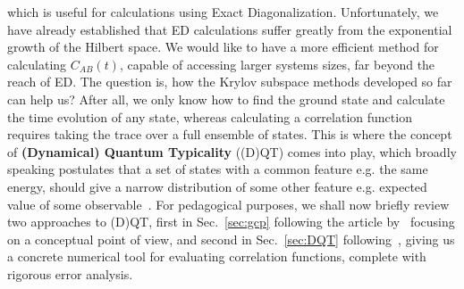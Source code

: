 which is useful for calculations using Exact Diagonalization. Unfortunately, we have already established that ED calculations
suffer greatly from the exponential growth of the Hilbert space.
We would like to have a more efficient method for calculating \(C_{AB}(t)\), capable of accessing larger systems
sizes, far beyond the reach of ED. The question is, how the Krylov subspace methods developed so far can help us?
After all, we only know how to find the ground state and calculate the time evolution of any state, whereas
calculating a correlation function requires taking the trace over a full ensemble of states. This is where the concept
of \textbf{(Dynamical) Quantum Typicality} ((D)QT) comes into play, which broadly speaking postulates that
a set of states with a common feature e.g. the same energy, should give a narrow distribution of some
other feature e.g. expected value of some observable~\autocite{Bartsch2009}. For pedagogical purposes, we shall
now briefly review two approaches to (D)QT, first in Sec.~\ref{sec:gcp} following the article by~\textcite{Popescu2006} focusing
on a conceptual point of view, and second in Sec.~\ref{sec:DQT} following~\textcite{Bartsch2009, Steinigeweg2014a}, giving us
a concrete numerical tool for evaluating correlation functions, complete with rigorous error analysis.

